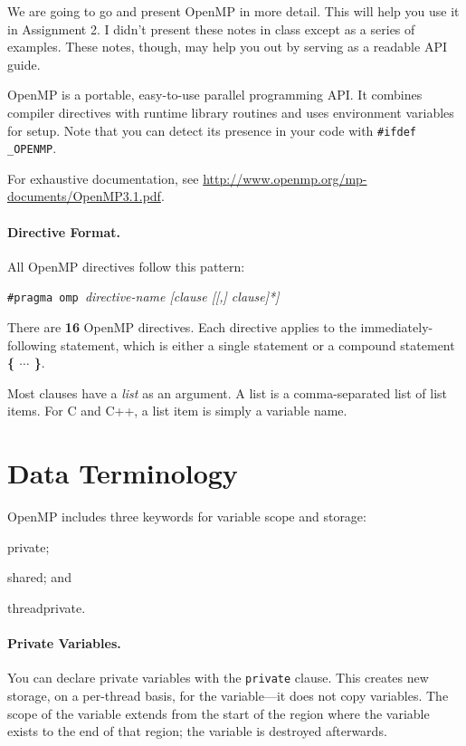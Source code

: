 




We are going to go and present OpenMP in more detail. This will help you 
use it in Assignment 2. I didn't present these notes in class except as a series
of examples. These notes, though, may help you out by serving as a readable API guide.

OpenMP is a portable, easy-to-use parallel programming API. It combines
compiler directives with runtime library routines and uses environment variables
for setup. Note that you can detect its presence in your code with {\tt \#ifdef \_OPENMP}.

For exhaustive documentation, see \url{http://www.openmp.org/mp-documents/OpenMP3.1.pdf}.

\paragraph{Directive Format.} All OpenMP directives follow this pattern:
  \begin{center}
    {\tt \#pragma omp }{\it directive-name [clause [[,] clause]*]}
  \end{center}

There are {\bf 16} OpenMP directives. Each directive applies to the immediately-following
statement, which is either a single statement or a compound statement {\bf \{  $\cdots$ \}}.

Most clauses have a \emph{list} as an argument. 
A list is a comma-separated list of list items. For C and C++, a list item 
is simply a variable name.

\section*{Data Terminology}

OpenMP includes three keywords for variable scope and storage:
\squishlist
        \item private;
        \item shared; and
        \item threadprivate.
\squishend

\paragraph{Private Variables.} You can declare private variables
with the {\tt private} clause. This creates new storage, on a per-thread
basis, for the variable---it does not copy variables. The scope
of the variable extends from the start of the region where the variable
exists to the end of that region; the variable is destroyed afterwards.

